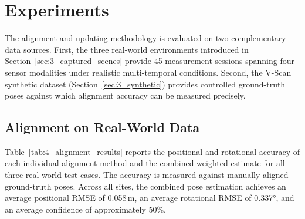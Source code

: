\section{Experiments}
\label{sec:4_experiments}

The alignment and updating methodology is evaluated on two complementary data sources. First, the three real-world environments introduced in Section~\ref{sec:3_captured_scenes} provide 45 measurement sessions spanning four sensor modalities under realistic multi-temporal conditions. Second, the V-Scan synthetic dataset (Section~\ref{sec:3_synthetic}) provides controlled ground-truth poses against which alignment accuracy can be measured precisely.

\subsection{Alignment on Real-World Data}
\label{sec:4_alignment_experiments}

Table~\ref{tab:4_alignment_results} reports the positional and rotational accuracy of each individual alignment method and the combined weighted estimate for all three real-world test cases. The accuracy is measured against manually aligned ground-truth poses. Across all sites, the combined pose estimation achieves an average positional RMSE of 0.058\,m, an average rotational RMSE of 0.337°, and an average confidence of approximately 50\%.

